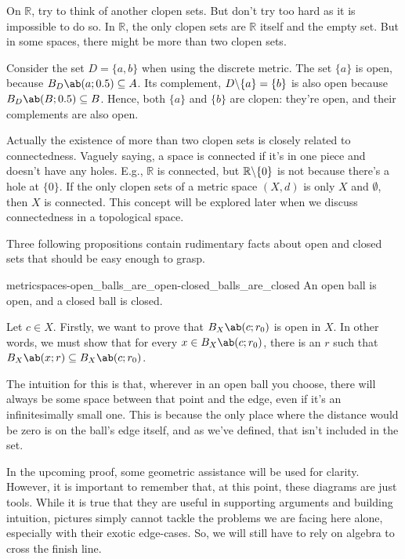 On \(\mathbb{R}\), try to think of another clopen sets. But don't try too hard as it is
impossible to do so. In \(\mathbb{R}\), the only clopen sets are \(\mathbb{R}\) itself
and the empty set. But in some spaces, there might be more than two clopen sets.

Consider the set \(D = \{a, b\}\) when using the discrete metric. The set \(\{a\}\)
is open, because \(\oball{D}{a}{0.5} \subseteq A\). Its complement,
\(D \backslash \{a\} = \{b\}\) is also open because \(\oball{D}{B}{0.5} \subseteq B\).
Hence, both \(\{a\}\) and \(\{b\}\) are clopen: they're open, and their complements are also open.

Actually the existence of more than two clopen sets is closely related to connectedness.
Vaguely saying, a space is connected if it's in one piece and doesn't have any holes.
E.g., \(\mathbb{R}\) is connected, but \(\mathbb{R} \backslash \{0\}\) is not because there's
a hole at \(\{0\}\). If the only clopen sets of a metric space \((X, d)\) is only \(X\) and
\(\emptyset\), then \(X\) is connected. This concept will be explored later when we
discuss connectedness in a topological space.

Three following propositions contain rudimentary facts about open and closed sets that
should be easy enough to grasp.

\begin{cor}{}{metricspaces-open_balls_are_open-closed_balls_are_closed}
  An open ball is open, and a closed ball is closed.
\end{cor}

Let \(c \in X\). Firstly, we want to prove that \(\oball{X}{c}{r_0}\) is open in \(X\).
In other words, we must show that for every \(x \in \oball{X}{c}{r_0}\), there is an
\(r\) such that \(\oball{X}{x}{r} \subseteq \oball{X}{c}{r_0}\).

The intuition for this is that, wherever in an open ball you choose, there will always
be some space between that point and the edge, even if it's an infinitesimally small
one. This is because the only place where the distance would be zero is on the ball's
edge itself, and as we've defined, that isn't included in the set.

In the upcoming proof, some geometric assistance will be used for clarity. However, it
is important to remember that, at this point, these diagrams are just tools. While it
is true that they are useful in supporting arguments and building intuition, pictures
simply cannot tackle the problems we are facing here alone, especially with their exotic
edge-cases. So, we will still have to rely on algebra to cross the finish line.

